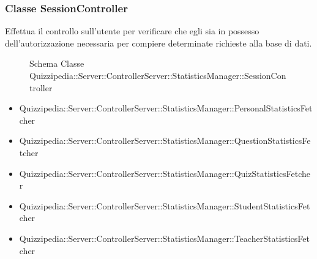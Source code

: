 \subsubsection{Classe SessionController}
Effettua il controllo sull'utente per verificare che egli sia in possesso dell'autorizzazione necessaria per compiere determinate richieste alla base di dati.
\begin{figure}[H]
\centering
\noindent{}
\caption{Schema Classe Quizzipedia::Server::ControllerServer::StatisticsManager::SessionController}
\end{figure}
\begin{itemize}
\item Quizzipedia::Server::ControllerServer::StatisticsManager::PersonalStatisticsFetcher
\item Quizzipedia::Server::ControllerServer::StatisticsManager::QuestionStatisticsFetcher
\item Quizzipedia::Server::ControllerServer::StatisticsManager::QuizStatisticsFetcher
\item Quizzipedia::Server::ControllerServer::StatisticsManager::StudentStatisticsFetcher
\item Quizzipedia::Server::ControllerServer::StatisticsManager::TeacherStatisticsFetcher
\end{itemize}
